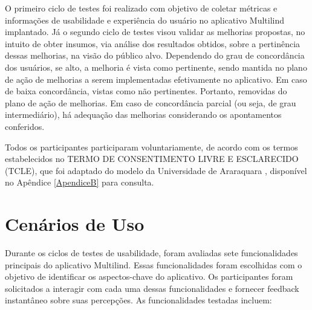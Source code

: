 O primeiro ciclo de testes foi realizado com objetivo de coletar métricas e informações de usabilidade e experiência do usuário no aplicativo Multilind implantado. Já o segundo ciclo de testes visou validar as 
melhorias propostas, no intuito de obter insumos, via análise dos resultados obtidos, sobre a pertinência dessas melhorias, na visão do público alvo. Dependendo do grau de concordância dos usuários, se alto, a 
melhoria é vista como pertinente, sendo mantida no plano de ação de melhorias a serem implementadas efetivamente no aplicativo. Em caso de baixa concordância, vistas como não pertinentes. Portanto, removidas 
do plano de ação de melhorias. Em caso de concordância parcial (ou seja, de grau intermediário), há adequação das melhorias considerando os apontamentos conferidos. 

Todos os participantes participaram voluntariamente, de acordo com os termos estabelecidos no  TERMO DE CONSENTIMENTO LIVRE E ESCLARECIDO (TCLE), que foi adaptado do modelo da Universidade de Araraquara \cite{tcle}, 
disponível no Apêndice \ref{ApendiceB} para consulta.

\section{Cenários de Uso}
\label{sec:Cenários de Uso}
Durante os ciclos de testes de usabilidade, foram avaliadas sete funcionalidades principais do aplicativo Multilind. Essas funcionalidades foram escolhidas com o objetivo de identificar os aspectos-chave do 
aplicativo. Os participantes foram solicitados a interagir com cada uma dessas funcionalidades e fornecer feedback instantâneo sobre suas percepções. As funcionalidades testadas incluem:


